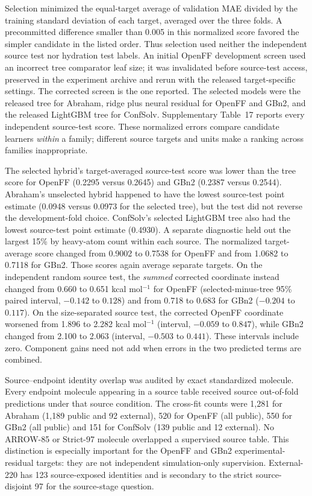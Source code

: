 Selection minimized the equal-target average of validation MAE divided by the
training standard deviation of each target, averaged over the three folds.
A precommitted difference smaller than 0.005 in this normalized score favored
the simpler candidate in the listed order. Thus selection used neither the
independent source test nor hydration test labels. An initial OpenFF development
screen used an incorrect tree comparator leaf size; it was invalidated before
source-test access, preserved in the experiment archive and rerun with the
released target-specific settings. The corrected screen is the one reported.
The selected models were the released tree for Abraham, ridge plus neural
residual for OpenFF and GBn2, and the released LightGBM tree for ConfSolv.
Supplementary Table~17 reports every independent source-test score. These
normalized errors compare candidate learners \emph{within} a family; different
source targets and units make a ranking across families inappropriate.

The selected hybrid's target-averaged source-test score was lower than the tree
score for OpenFF (0.2295 versus 0.2645) and GBn2 (0.2387 versus 0.2544).
Abraham's unselected hybrid happened to have the lowest source-test point
estimate (0.0948 versus 0.0973 for the selected tree), but the test did not
reverse the development-fold choice. ConfSolv's selected LightGBM tree also
had the lowest source-test point estimate (0.4930). A separate diagnostic held
out the largest 15\% by heavy-atom count within each source. The normalized
target-average score changed from 0.9002 to 0.7538 for OpenFF and from 1.0682
to 0.7118 for GBn2. Those scores again average separate targets. On the
independent random source test, the \emph{summed} corrected coordinate instead
changed from 0.660 to 0.651 kcal mol$^{-1}$ for OpenFF (selected-minus-tree
95\% paired interval, $-0.142$ to $0.128$) and from 0.718 to 0.683 for GBn2
($-0.204$ to $0.117$). On the size-separated source test, the corrected OpenFF
coordinate worsened from 1.896 to 2.282 kcal mol$^{-1}$ (interval, $-0.059$
to $0.847$), while GBn2 changed from 2.100 to 2.063 (interval, $-0.503$
to $0.441$). These intervals include zero. Component gains need not add when
errors in the two predicted terms are combined.

Source--endpoint identity overlap was audited by exact standardized molecule.
Every endpoint molecule appearing in a source table received source out-of-fold
predictions under that source condition. The cross-fit counts were 1,281 for
Abraham (1,189 public and 92 external), 520 for OpenFF (all public), 550 for
GBn2 (all public) and 151 for ConfSolv (139 public and 12 external). No ARROW-85
or Strict-97 molecule overlapped a supervised source table. This distinction is
especially important for the OpenFF and GBn2 experimental-residual targets:
they are not independent simulation-only supervision. External-220 has 123
source-exposed identities and is secondary to the strict source-disjoint 97
for the source-stage question.

